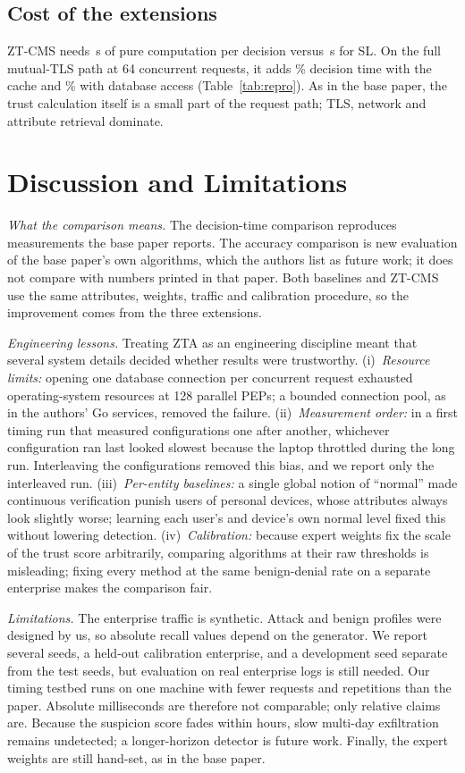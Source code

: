 \documentclass[conference,a4paper]{IEEEtran}
\begin{document}
\subsection{Cost of the extensions}
ZT-CMS needs \UsZ\,\textmu s of pure computation per decision versus \UsSLD\,\textmu s for SL. On the full mutual-TLS path at 64 concurrent requests, it adds \ZvsSLDC\% decision time with the cache and \ZvsSLDDB\% with database access (Table~\ref{tab:repro}). As in the base paper, the trust calculation itself is a small part of the request path; TLS, network and attribute retrieval dominate.

\section{Discussion and Limitations}\label{sec:disc}
\emph{What the comparison means.} The decision-time comparison reproduces measurements the base paper reports. The accuracy comparison is new evaluation of the base paper's own algorithms, which the authors list as future work; it does not compare with numbers printed in that paper. Both baselines and ZT-CMS use the same attributes, weights, traffic and calibration procedure, so the improvement comes from the three extensions.

\emph{Engineering lessons.} Treating ZTA as an engineering discipline meant that several system details decided whether results were trustworthy. (i)~\emph{Resource limits:} opening one database connection per concurrent request exhausted operating-system resources at 128 parallel PEPs; a bounded connection pool, as in the authors' Go services, removed the failure. (ii)~\emph{Measurement order:} in a first timing run that measured configurations one after another, whichever configuration ran last looked slowest because the laptop throttled during the long run. Interleaving the configurations removed this bias, and we report only the interleaved run. (iii)~\emph{Per-entity baselines:} a single global notion of ``normal'' made continuous verification punish users of personal devices, whose attributes always look slightly worse; learning each user's and device's own normal level fixed this without lowering detection. (iv)~\emph{Calibration:} because expert weights fix the scale of the trust score arbitrarily, comparing algorithms at their raw thresholds is misleading; fixing every method at the same benign-denial rate on a separate enterprise makes the comparison fair.

\emph{Limitations.} The enterprise traffic is synthetic. Attack and benign profiles were designed by us, so absolute recall values depend on the generator. We report several seeds, a held-out calibration enterprise, and a development seed separate from the test seeds, but evaluation on real enterprise logs is still needed. Our timing testbed runs on one machine with fewer requests and repetitions than the paper. Absolute milliseconds are therefore not comparable; only relative claims are. Because the suspicion score fades within hours, slow multi-day exfiltration remains undetected; a longer-horizon detector is future work. Finally, the expert weights are still hand-set, as in the base paper.
\end{document}
